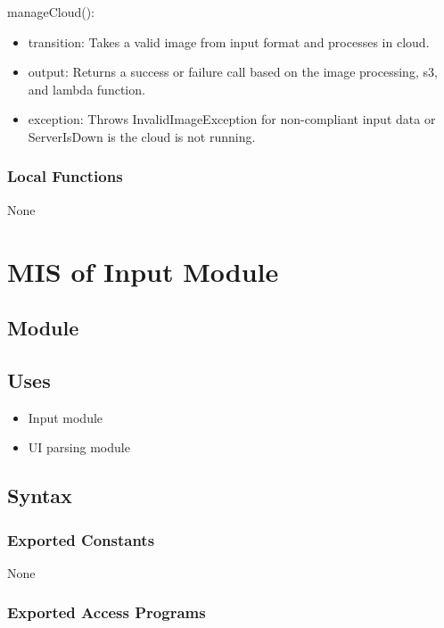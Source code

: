 \documentclass[12pt, titlepage]{article}
\begin{document}
\noindent manageCloud():
\begin{itemize}
\item transition: Takes a valid image from input format and processes in cloud.
\item output: Returns a success or failure call based on the image processing, s3, and lambda function.
\item exception: Throws InvalidImageException for non-compliant input data or ServerIsDown is the cloud is not running.
\end{itemize}

\subsubsection{Local Functions}

None

\newpage


\section{MIS of Input Module} \label{Module}

\subsection{Module}

\subsection{Uses}

\begin{itemize}
  \item Input module
  \item UI parsing module
\end{itemize}

\subsection{Syntax}

\subsubsection{Exported Constants}

None

\subsubsection{Exported Access Programs}
\end{document}
